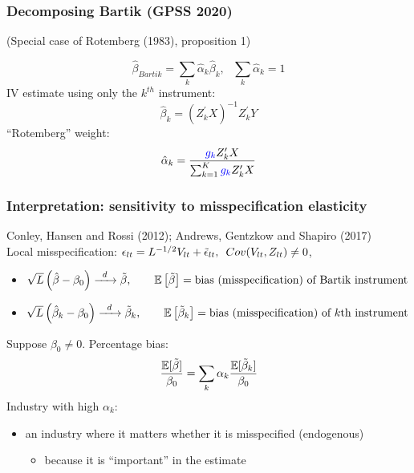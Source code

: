 \documentclass[notes,11pt, aspectratio=169]{beamer}
\begin{document}
\begin{frame}[label=rotemberg]
\frametitle{Decomposing Bartik (GPSS 2020)}
\begin{center}
(Special case of Rotemberg (1983), proposition 1)
\end{center}
\vspace{0.2in}




$$\hat{\beta}_{Bartik} =\sum_k  \hat{\alpha}_k \hat{\beta}_k , \text{      } \sum_k \hat{\alpha}_k=1$$   
IV estimate using only the $k^{th}$ instrument:
$$\hat{\beta}_k = (Z_k^\prime X)^{-1} Z_k^\prime Y$$
``Rotemberg'' weight:
$$ \hat{\alpha}_k = \frac{ \textcolor{blue}{g_k} Z_k^\prime X}{\sum_{k=1}^K \textcolor{blue}{g_k} Z_k^\prime X}$$



\hyperlink{rotproof}{}

\end{frame}




\begin{frame}
\frametitle{Interpretation: sensitivity to misspecification elasticity}
\begin{center}
  Conley, Hansen and Rossi (2012); Andrews, Gentzkow and Shapiro (2017)\\
  Local misspecification:  $\epsilon_{lt} = L^{-1/2}V_{lt} + \tilde{\epsilon}_{lt}, \enskip Cov(V_{lt}, Z_{lt}) \not=0$,
\end{center}

\begin{itemize}
 \item $   \sqrt{L}\left(\hat{\beta} - \beta_0\right) \xrightarrow{\enskip d \enskip} \tilde{\beta}, \qquad \mathbb{E}\left[\tilde{\beta}\right] = \text{bias (misspecification) of Bartik instrument}$
 \item $   \sqrt{L}\left(\hat{\beta}_{k} - \beta_0\right) \xrightarrow{\enskip d \enskip} \tilde{\beta}_{k}, \qquad \mathbb{E}\left[\tilde{\beta}_{k}\right] = \text{bias (misspecification) of  $k$th  instrument}$

\end{itemize}

Suppose $\beta_0 \neq 0$.  Percentage bias:
\begin{equation}
  \frac{\mathbb{E}[\tilde{\beta}]}{\beta_{0}} = \sum_{k}\alpha_{k}\frac{\mathbb{E}[\tilde{\beta}_{k}]}{\beta_{0}} \notag
\end{equation} 
Industry with high $\alpha_k$: 
\begin{itemize}
\item an industry where it matters whether it is misspecified (endogenous) 
	\begin{itemize}
\item  because it is ``important'' in the estimate
	\end{itemize}
\end{itemize}


\end{frame}
\end{document}
